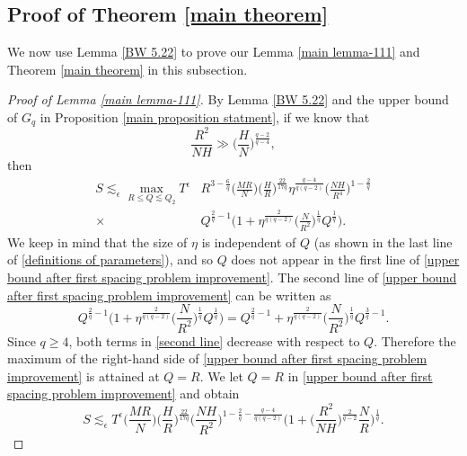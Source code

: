 \documentclass[11pt]{amsart}
\numberwithin{equation}{section}
\theoremstyle{definition}
\theoremstyle{proposition}
\begin{document}
\subsection{Proof of Theorem \ref{main theorem}}

We now use Lemma \ref{BW 5.22} to prove our Lemma \ref{main lemma-111} and Theorem \ref{main theorem} in this subsection.

\begin{proof} [Proof of Lemma \ref{main lemma-111}]
By Lemma \ref{BW 5.22} and the upper bound of $G_q$ in Proposition \ref{main proposition statment}, if we know that
\begin{equation}    \label{condition 1---}
\frac{R^2}{NH} \gg \Big(\frac{H}{N}\Big)^{\frac{q-2}{q-4}},
\end{equation}
then  
\begin{equation}   \label{upper bound after first spacing problem improvement}
\begin{split}
S \lesssim_\epsilon \max_{R\le Q\lesssim Q_2}  T^\epsilon   & R^{3-\frac{6}{q}} \Big(\frac{MR}{N} \Big) \Big(\frac{H}{R}\Big)^{\frac{22}{17q}} \eta^{\frac{q-4}{q(q-2)}} \Big(\frac{NH}{R^4}\Big)^{1-\frac{2}{q}}   
\\ \times & Q^{\frac{2}{q}-1}\Big(1+\eta^{\frac{2}{q(q-2)}}\Big(\frac{N}{R^2}\Big)^{\frac{1}{q}}Q^{\frac{1}{q}}\Big).
\end{split}    
\end{equation}
We keep in mind that the size of $\eta$ is independent of $Q$ (as shown in the last line of \eqref{definitions of parameters}), and so $Q$ does not appear in the first line of \eqref{upper bound after first spacing problem improvement}. The second line of \eqref{upper bound after first spacing problem improvement} can be written as 
\begin{equation}   \label{second line}
Q^{\frac{2}{q}-1}\Big(1+\eta^{\frac{2}{q(q-2)}}\Big(\frac{N}{R^2}\Big)^{\frac{1}{q}}Q^{\frac{1}{q}}\Big)=Q^{\frac{2}{q}-1}+\eta^{\frac{2}{q(q-2)}}\Big(\frac{N}{R^2}\Big)^{\frac{1}{q}}Q^{\frac{3}{q}-1}.   
\end{equation}
Since $q\ge 4$, both terms in \eqref{second line} decrease with respect to $Q$. Therefore the maximum of the right-hand side of \eqref{upper bound after first spacing problem improvement} is attained at $Q=R$. We let $Q=R$ in \eqref{upper bound after first spacing problem improvement} and obtain 
\begin{equation}    \label{plug in Q=R}
S \lesssim_\epsilon T^\epsilon  \Big(\frac{MR}{N}\Big) \Big(\frac{H}{R} \Big)^{\frac{22}{17q}} \Big(\frac{NH}{R^2}\Big)^{1-\frac{2}{q}-\frac{q-4}{q(q-2)}}\Big(1+\Big(\frac{R^2}{NH}\Big)^{\frac{2}{q-2}}\frac{N}{R}\Big)^{\frac{1}{q}}.   

\end{equation}
\end{proof}
\end{document}
